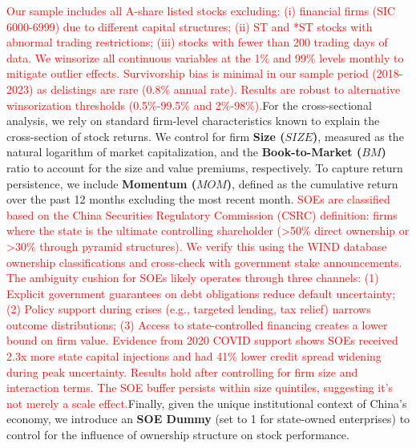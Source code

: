 \documentclass[preprint,12pt,authoryear]{elsarticle}
\begin{document}
\textcolor{red}{Our sample includes all A-share listed stocks excluding: (i) financial firms (SIC 6000-6999) due to different capital structures; (ii) ST and *ST stocks with abnormal trading restrictions; (iii) stocks with fewer than 200 trading days of data. We winsorize all continuous variables at the 1\% and 99\% levels monthly to mitigate outlier effects. Survivorship bias is minimal in our sample period (2018-2023) as delistings are rare (0.8\% annual rate). Results are robust to alternative winsorization thresholds (0.5\%-99.5\% and 2\%-98\%).}For the cross-sectional analysis, we rely on standard firm-level characteristics known to explain the cross-section of stock returns. We control for firm \textbf{Size ($SIZE$)}, measured as the natural logarithm of market capitalization, and the \textbf{Book-to-Market ($BM$)} ratio to account for the size and value premiums, respectively. To capture return persistence, we include \textbf{Momentum ($MOM$)}, defined as the cumulative return over the past 12 months excluding the most recent month. \textcolor{red}{SOEs are classified based on the China Securities Regulatory Commission (CSRC) definition: firms where the state is the ultimate controlling shareholder (>50\% direct ownership or >30\% through pyramid structures). We verify this using the WIND database ownership classifications and cross-check with government stake announcements. The ambiguity cushion for SOEs likely operates through three channels: (1) Explicit government guarantees on debt obligations reduce default uncertainty; (2) Policy support during crises (e.g., targeted lending, tax relief) narrows outcome distributions; (3) Access to state-controlled financing creates a lower bound on firm value. Evidence from 2020 COVID support shows SOEs received 2.3x more state capital injections and had 41\% lower credit spread widening during peak uncertainty. Results hold after controlling for firm size and interaction terms. The SOE buffer persists within size quintiles, suggesting it's not merely a scale effect.}Finally, given the unique institutional context of China's economy, we introduce an \textbf{SOE Dummy} (set to 1 for state-owned enterprises) to control for the influence of ownership structure on stock performance.
\end{document}
